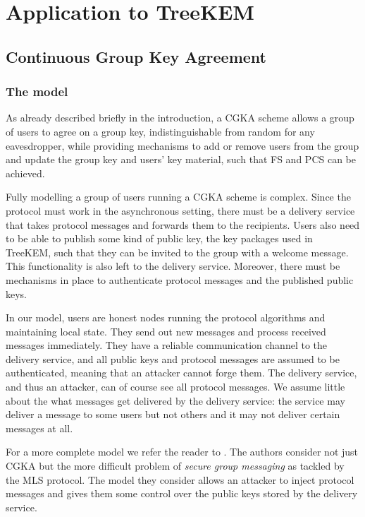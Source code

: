 \chapter{Application to TreeKEM} \label{sec:application-to-treekem}

\section{Continuous Group Key Agreement}

\subsection{The model}

As already described briefly in the introduction, a CGKA scheme allows a group of users to agree on a group key, indistinguishable from random for any eavesdropper, while providing mechanisms to add or remove users from the group and update the group key and users' key material, such that FS and PCS can be achieved.

Fully modelling a group of users running a CGKA scheme is complex. Since the protocol must work in the asynchronous setting, there must be a delivery service that takes protocol messages and forwards them to the recipients. Users also need to be able to publish some kind of public key, the key packages used in TreeKEM, such that they can be invited to the group with a welcome message. This functionality is also left to the delivery service. Moreover, there must be mechanisms in place to authenticate protocol messages and the published public keys.

In our model, users are honest nodes running the protocol algorithms and maintaining local state. They send out new messages and process received messages immediately. They have a reliable communication channel to the delivery service, and all public keys and protocol messages are assumed to be authenticated, meaning that an attacker cannot forge them. The delivery service, and thus an attacker, can of course see all protocol messages. We assume little about the what messages get delivered by the delivery service: the service may deliver a message to some users but not others and it may not deliver certain messages at all.

For a more complete model we refer the reader to \cite{modular-group-messaging}. The authors consider not just CGKA but the more difficult problem of \emph{secure group messaging} as tackled by the MLS protocol. The model they consider allows an attacker to inject protocol messages and gives them some control over the public keys stored by the delivery service.

